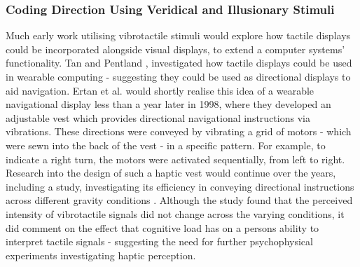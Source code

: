 \documentclass{mpaper}
\begin{document}
\subsubsection{Coding Direction Using Veridical and Illusionary Stimuli}
Much early work utilising vibrotactile stimuli would explore how tactile displays could be incorporated alongside visual displays, to extend a computer systems’ functionality. Tan and Pentland \cite{629923}, investigated how tactile displays could be used in wearable computing - suggesting they could be used as directional displays to aid navigation. Ertan et al. \cite{729547} would shortly realise this idea of a wearable navigational display less than a year later in 1998, where they developed an adjustable vest which provides directional navigational instructions via vibrations. These directions were conveyed by vibrating a grid of motors - which were sewn into the back of the vest - in a specific pattern. For example, to indicate a right turn, the motors were activated sequentially, from left to right. Research into the design of such a haptic vest would continue over the years, including a study, investigating its efficiency in conveying directional instructions across different gravity conditions \cite{998954}. Although the study found that the perceived intensity of vibrotactile signals did not change across the varying conditions, it did comment on the effect that cognitive load has on a persons ability to interpret tactile signals - suggesting the need for further psychophysical experiments investigating haptic perception.
\end{document}
